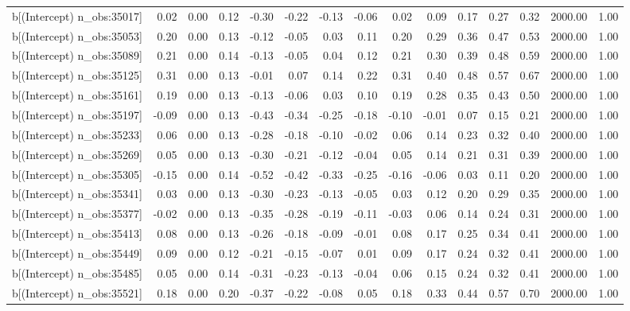 \begin{table}[ht]
\begin{tabular}{rrrrrrrrrrrrrrr}
  b[(Intercept) n\_obs:35017] & 0.02 & 0.00 & 0.12 & -0.30 & -0.22 & -0.13 & -0.06 & 0.02 & 0.09 & 0.17 & 0.27 & 0.32 & 2000.00 & 1.00 \\ 
  b[(Intercept) n\_obs:35053] & 0.20 & 0.00 & 0.13 & -0.12 & -0.05 & 0.03 & 0.11 & 0.20 & 0.29 & 0.36 & 0.47 & 0.53 & 2000.00 & 1.00 \\ 
  b[(Intercept) n\_obs:35089] & 0.21 & 0.00 & 0.14 & -0.13 & -0.05 & 0.04 & 0.12 & 0.21 & 0.30 & 0.39 & 0.48 & 0.59 & 2000.00 & 1.00 \\ 
  b[(Intercept) n\_obs:35125] & 0.31 & 0.00 & 0.13 & -0.01 & 0.07 & 0.14 & 0.22 & 0.31 & 0.40 & 0.48 & 0.57 & 0.67 & 2000.00 & 1.00 \\ 
  b[(Intercept) n\_obs:35161] & 0.19 & 0.00 & 0.13 & -0.13 & -0.06 & 0.03 & 0.10 & 0.19 & 0.28 & 0.35 & 0.43 & 0.50 & 2000.00 & 1.00 \\ 
  b[(Intercept) n\_obs:35197] & -0.09 & 0.00 & 0.13 & -0.43 & -0.34 & -0.25 & -0.18 & -0.10 & -0.01 & 0.07 & 0.15 & 0.21 & 2000.00 & 1.00 \\ 
  b[(Intercept) n\_obs:35233] & 0.06 & 0.00 & 0.13 & -0.28 & -0.18 & -0.10 & -0.02 & 0.06 & 0.14 & 0.23 & 0.32 & 0.40 & 2000.00 & 1.00 \\ 
  b[(Intercept) n\_obs:35269] & 0.05 & 0.00 & 0.13 & -0.30 & -0.21 & -0.12 & -0.04 & 0.05 & 0.14 & 0.21 & 0.31 & 0.39 & 2000.00 & 1.00 \\ 
  b[(Intercept) n\_obs:35305] & -0.15 & 0.00 & 0.14 & -0.52 & -0.42 & -0.33 & -0.25 & -0.16 & -0.06 & 0.03 & 0.11 & 0.20 & 2000.00 & 1.00 \\ 
  b[(Intercept) n\_obs:35341] & 0.03 & 0.00 & 0.13 & -0.30 & -0.23 & -0.13 & -0.05 & 0.03 & 0.12 & 0.20 & 0.29 & 0.35 & 2000.00 & 1.00 \\ 
  b[(Intercept) n\_obs:35377] & -0.02 & 0.00 & 0.13 & -0.35 & -0.28 & -0.19 & -0.11 & -0.03 & 0.06 & 0.14 & 0.24 & 0.31 & 2000.00 & 1.00 \\ 
  b[(Intercept) n\_obs:35413] & 0.08 & 0.00 & 0.13 & -0.26 & -0.18 & -0.09 & -0.01 & 0.08 & 0.17 & 0.25 & 0.34 & 0.41 & 2000.00 & 1.00 \\ 
  b[(Intercept) n\_obs:35449] & 0.09 & 0.00 & 0.12 & -0.21 & -0.15 & -0.07 & 0.01 & 0.09 & 0.17 & 0.24 & 0.32 & 0.41 & 2000.00 & 1.00 \\ 
  b[(Intercept) n\_obs:35485] & 0.05 & 0.00 & 0.14 & -0.31 & -0.23 & -0.13 & -0.04 & 0.06 & 0.15 & 0.24 & 0.32 & 0.41 & 2000.00 & 1.00 \\ 
  b[(Intercept) n\_obs:35521] & 0.18 & 0.00 & 0.20 & -0.37 & -0.22 & -0.08 & 0.05 & 0.18 & 0.33 & 0.44 & 0.57 & 0.70 & 2000.00 & 1.00 \\ 

\end{tabular}
\end{table}
